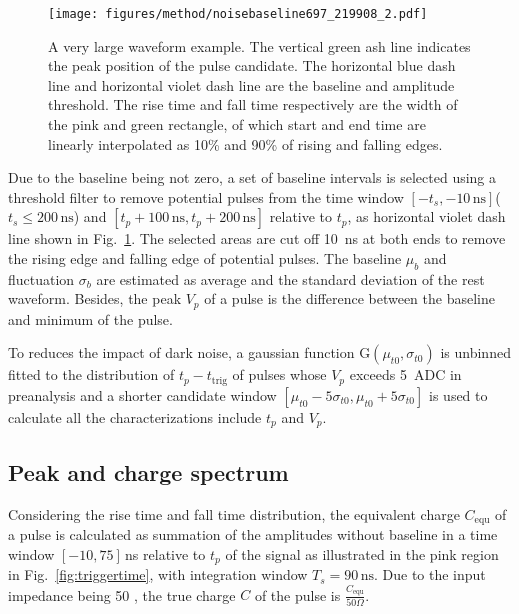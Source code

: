 \begin{figure}[!htbp]
    \centering
    \texttt{[image: figures/method/noisebaseline697\_219908\_2.pdf]}
    \caption{A very large waveform example. The vertical green ash line indicates the peak position of the pulse candidate. The horizontal blue dash line and horizontal violet dash line are the baseline and amplitude threshold. The rise time and fall time respectively are the width of the pink and green rectangle, of which start and end time are linearly interpolated as 10\% and 90\% of rising and falling edges.}
    \label{fig:baseline1}
\end{figure}

Due to the baseline being not zero, a set of baseline intervals is selected using a threshold filter to remove potential pulses from the time window $[-t_s,-10\,\mathrm{ns}]$($t_s\leq200\,\mathrm{ns}$) and $[t_p+100\,\mathrm{ns},t_p+200\,\mathrm{ns}]$ relative to $t_p$, as horizontal violet dash line shown in Fig.~\ref{fig:baseline1}. The selected areas are cut off \SI{10}{ns} at both ends to remove the rising edge and falling edge of potential pulses. The baseline $\mu_b$ and fluctuation $\sigma_b$ are estimated as average and the standard deviation of the rest waveform. Besides, the peak $V_p$ of a pulse is the difference between the baseline and minimum of the pulse. 

To reduces the impact of dark noise, a gaussian function G$(\mu_{t0},\sigma_{t0})$ is unbinned fitted to the distribution of $t_p-t_{\mathrm{trig}}$ of pulses whose $V_p$ exceeds \SI{5}{ADC} in preanalysis and a shorter candidate window $[\mu_{t0}-5\sigma_{t0}, \mu_{t0}+5\sigma_{t0}]$ is used to calculate all the characterizations include $t_p$ and $V_p$.

\subsection{Peak and charge spectrum}
\label{sec:noisepeak}

Considering the rise time and fall time distribution, the equivalent charge $C_{\mathrm{equ}}$ of a pulse is calculated as summation of the amplitudes without baseline in a time window $[-10, 75]$\,ns relative to $t_p$ of the signal as illustrated in the pink region in Fig.~\ref{fig:triggertime}, with integration window $T_s=90\,\mathrm{ns}$. Due to the input impedance being \SI{50}{\Omega} \cite{CAENV1751}, the true charge $C$ of the pulse is $\frac{C_{\mathrm{equ}}}{50 \Omega}$.

